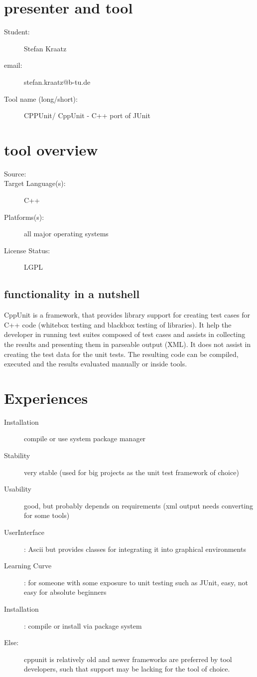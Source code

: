 \documentclass[10pt,a4paper,onecolumn,notitlepage]{article}
\author{Stefan Kraatz}
\begin{document}
\section*{presenter and tool}
\begin{description}
\item[Student:] Stefan Kraatz 
\item[email:] stefan.kraatz@b-tu.de
\item[Tool name (long/short):] CPPUnit/ CppUnit - C++ port of JUnit
\end{description}
\section*{tool overview}
\begin{description}
\item[Source:]
\item[Target Language(s):] C++
\item[Platforms(s):] all major operating systems
\item[License Status:] LGPL
\end{description}
\subsection*{functionality in a nutshell}
CppUnit is a framework, that provides library support for creating test cases for C++ code (whitebox testing and blackbox testing of libraries). It help the developer in running test suites composed of test cases and assists in collecting the results and presenting them in parseable output (XML). It does not assist in creating the test data for the unit tests. The resulting code can be compiled, executed and the results evaluated manually or inside tools.
\section*{Experiences}
\begin{description}
\item[Installation] compile or use system package manager
\item[Stability] very stable (used for big projects as the unit test framework of choice)
\item[Usability] good, but probably depends on requirements (xml output needs converting for some tools)
\item[UserInterface]: Ascii but provides classes for integrating it into graphical environments
\item[Learning Curve]: for someone with some exposure to unit testing such as JUnit, easy, not easy for absolute beginners 
\item[Installation] : compile or install via package system
\item[Else:] cppunit is relatively old and newer frameworks are preferred by tool developers, such that support may be lacking for the tool of choice. 
\end{description}
\end{document}
